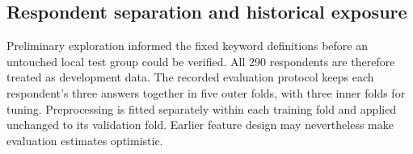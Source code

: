 \subsection{Respondent separation and historical exposure}

Preliminary exploration informed the fixed keyword definitions before an untouched local test group could be verified. All 290 respondents are therefore treated as development data. The recorded evaluation protocol keeps each respondent's three answers together in five outer folds, with three inner folds for tuning. Preprocessing is fitted separately within each training fold and applied unchanged to its validation fold. Earlier feature design may nevertheless make evaluation estimates optimistic.
